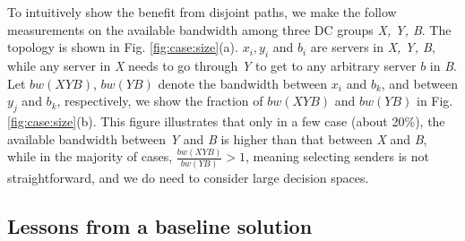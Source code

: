 To intuitively show the benefit from disjoint paths, we make the follow measurements on the available bandwidth among three DC groups \emph{X, Y, B}. The topology is shown in Fig. \ref{fig:case:size}(a). $x_i,y_i$ and $b_i$ are servers in \emph{X, Y, B}, while any server in \emph{X} needs to go through \emph{Y} to get to any arbitrary server $b$ in \emph{B}. Let $bw(XYB)$, $bw(YB)$ denote the bandwidth between $x_i$ and $b_k$, and between $y_j$ and $b_k$, respectively, we show the fraction of $bw(XYB)$ and $bw(YB)$ in Fig. \ref{fig:case:size}(b). This figure illustrates that only in a few case (about 20\%), the available bandwidth between \emph{Y} and \emph{B} is higher than that between \emph{X} and \emph{B}, while in the majority of cases, $\frac{bw(XYB)}{bw(YB)}>1$, meaning selecting senders is not straightforward, and we do need to consider large decision spaces.

%
%
%
%

\subsection{Lessons from a baseline solution}
\label{subsec:motivation:baseline}



